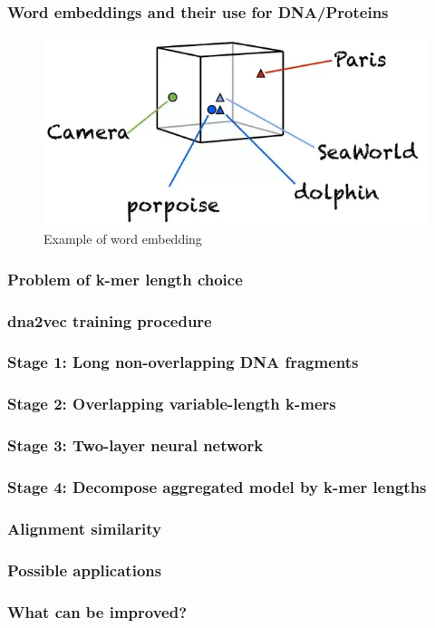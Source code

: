 \documentclass[11pt,xcolor=x11names,compress]{beamer}
\renewcommand{\(}{\begin{columns}}
\renewcommand{\)}{\end{columns}}
\newcommand{\<}[1]{\begin{column}{#1}}
\renewcommand{\>}{\end{column}}
\begin{document}
\begin{frame}
	\frametitle{Word embeddings and their use for DNA/Proteins}
	\begin{figure}
		\includegraphics[width=\textwidth]{word_embeddings.png}
		\caption*{\tiny{Example of word embedding}}
	\end{figure}
\end{frame}


\begin{frame}
	\frametitle{Problem of k-mer length choice}
\end{frame}

\begin{frame}
	\frametitle{dna2vec training procedure}
\end{frame}

\begin{frame}
	\frametitle{Stage 1: Long non-overlapping DNA fragments}
\end{frame}

\begin{frame}
	\frametitle{Stage 2: Overlapping variable-length k-mers}
\end{frame}

\begin{frame}
	\frametitle{Stage 3: Two-layer neural network}
\end{frame}

\begin{frame}
	\frametitle{Stage 4: Decompose aggregated model by k-mer lengths}
\end{frame}

\begin{frame}
	\frametitle{Alignment similarity}
\end{frame}

\begin{frame}
	\frametitle{Possible applications}
\end{frame}

\begin{frame}
	\frametitle{What can be improved?}
\end{frame}
\end{document}
